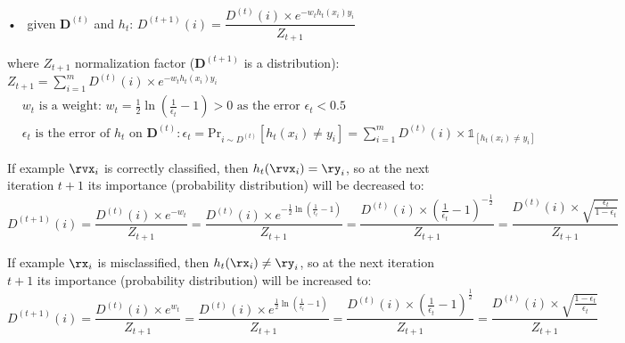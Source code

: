 \documentclass{article}
\newcommand{\<}{\langle}
\renewcommand{\>}{\rangle}
\theoremstyle{definition}
\def\sone{{\mathds{1}}}
\def\sone{{\mathds{1}}}
\newcommand{\dt}{D^{(t)}}
\newcommand{\dti}{D^{(t)}(i)}
\newcommand{\dtti}{D^{(t+1)}(i)}
\newcommand{\bdt}{\mathbf{D}^{(t)}}
\newcommand{\bdtt}{\mathbf{D}^{(t+1)}}
\newcommand{\zto}{Z_{t+1}}
\begin{document}
\quad • \, given $\bdt$ and $h_t$: $\dtti = \dfrac{\dti \times e^{-w_t h_t(x_i)y_i}}{Z_{t+1}}$

where $\zto$ normalization factor ($\bdtt$ is a distribution):
$\zto = \sum\limits_{i=1}^m \dti \times e^{-w_t h_t(x_i)y_i}$
\begin{align*}
&w_t \text{ is a weight: } w_t = \frac{1}{2}\ln\left(\frac{1}{\epsilon_t}-1\right)>0
  \text{ as the error } \epsilon_t < 0.5 \\
&\epsilon_t \text{ is the error of } h_t \text{ on } \bdt:
  \epsilon_t = \text{Pr}_{i \sim \dt}[h_t(x_i) \neq y_i] =
  \sum_{i=1}^m \dti \times \sone_{[h_t(x_i) \neq y_i]}
\end{align*}

If example $\rvx_i$ is correctly classified, then $h_t(\rvx_i) = \ry_i$, so at the next
iteration $t+1$ its importance (probability distribution) will be decreased to:
\[
\dtti = \frac{\dti \times e^{-w_t}}{\zto} =
  \dfrac{\dti \times e^{-\frac{1}{2}\ln\left(\frac{1}{\epsilon_t}-1\right)}}{\zto} =
  \dfrac{\dti \times \left(\frac{1}{\epsilon_t}-1\right)^{-\frac{1}{2}}}{\zto} =
  \dfrac{\dti \times \sqrt{\frac{\epsilon_t}{1-\epsilon_t}}}{\zto}
\]

If example $\rx_i$ is misclassified, then $h_t(\rx_i) \neq \ry_i$, so at the next
iteration $t+1$ its importance (probability distribution) will be increased to:
\[
\dtti = \frac{\dti \times e^{w_t}}{\zto} =
  \dfrac{\dti \times e^{\frac{1}{2}\ln\left(\frac{1}{\epsilon_t}-1\right)}}{\zto} =
  \dfrac{\dti \times \left(\frac{1}{\epsilon_t}-1\right)^{\frac{1}{2}}}{\zto} =
  \dfrac{\dti \times \sqrt{\frac{1-\epsilon_t}{\epsilon_t}}}{\zto}
\]
\end{document}
